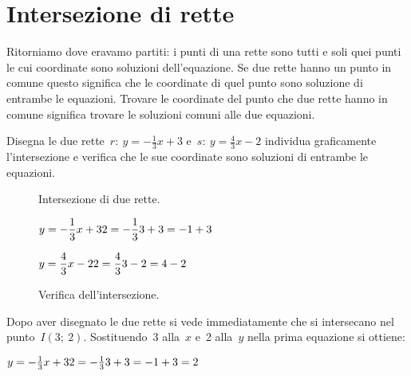 \section{Intersezione di rette}
\label{sec:retta_intersezionedirette}

Ritorniamo dove eravamo partiti: i punti di una rette sono tutti e soli quei 
punti le cui coordinate sono soluzioni dell'equazione. Se due rette hanno un 
punto in comune questo significa che le coordinate di quel punto sono 
soluzione di entrambe le equazioni. Trovare le coordinate del punto che due 
rette hanno in comune significa trovare le soluzioni comuni alle due equazioni.

\begin{exrig}
 \begin{esempio}
  Disegna le due rette~$r:~y = -\frac{1}{3} x +3$ e~$s:~y = \frac{4}{3} x -2$ 
  individua graficamente l'intersezione e verifica che 
  le sue coordinate sono soluzioni di entrambe le equazioni.
\begin{inaccessibleblock}
 \begin{figure}[h]
 \centering
 \begin{minipage}[]{.60\textwidth}
   \centering
  \caption{Intersezione di due rette.}\label{fig:intersezione01}
 \end{minipage}
 \begin{minipage}[]{.30\textwidth}
  \begin{center}

   $y = -\dfrac{1}{3} x +3 \newline
    2 = -\dfrac{1}{3} 3 +3 = -1 + 3$
   
   $y = \dfrac{4}{3} x -2 \newline
    2 = \dfrac{4}{3} 3 -2 = 4 -2$

  \end{center}
  \caption{Verifica dell'intersezione.}\label{fig:elementi}
 \end{minipage}
\end{figure}
\end{inaccessibleblock}
 \end{esempio}
\end{exrig}

   Dopo aver disegnato le due rette si vede immediatamente che si intersecano 
   nel punto~$I(3;~2)$. Sostituendo~3 alla~$x$ e~2 
   alla~$y$ nella prima equazione si ottiene:
   
   $y = -\frac{1}{3} x +3 \newline
    2 = -\frac{1}{3} 3 +3 = -1 + 3 = 2$
   
